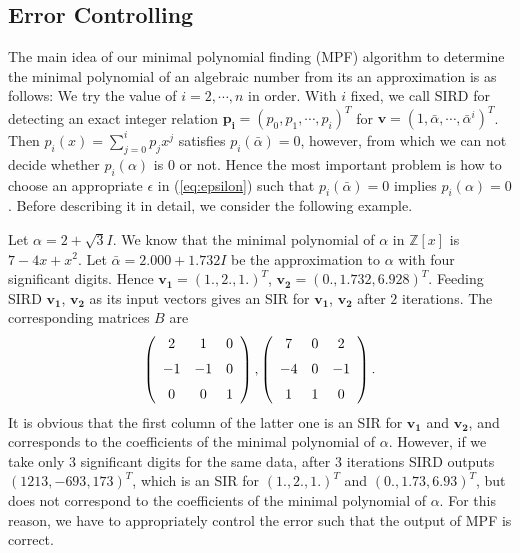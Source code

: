 \documentclass{sig-alternate}
\numberwithin{theorem}{section} \numberwithin{equation}{section}
\begin{document}
\subsection{Error Controlling}
\label{subsec:Finding the Minimal Polynomial Using Float-point
Arithmetic}






 The main idea of our minimal
polynomial finding (MPF) algorithm to determine the minimal
polynomial of an algebraic number from its an approximation is as
follows: We try the value of  $i=2,\cdots,n$ in order. With $i$
fixed, we call SIRD for detecting an exact integer relation
$\mathbf{p_i}=(p_0,p_1,\cdots,p_i)^T$ for $\mathbf{v}=(1,
\bar{\alpha}, \cdots, \bar{\alpha}^i)^T$. Then
$p_i(x)=\sum_{j=0}^ip_jx^j$ satisfies $p_i(\bar{\alpha})=0$,
however, from which we can not decide whether $p_i(\alpha)$ is $0$
or not. Hence the most important problem is how to choose an
appropriate $\epsilon$ in (\ref{eq:epsilon}) such that
$p_i(\bar{\alpha})=0$ implies $p_i(\alpha)=0$.
Before describing it
in detail, we consider the following example.

\begin{exmp}\label{exmp:x^2-4x+7}
Let $\alpha = 2 + \sqrt{3}I$. We know that the minimal polynomial of
$\alpha$ in $\mathbb{Z}[x]$ is $7-4x+x^2$. Let $\bar{\alpha} = 2.000
+ 1.732 I$ be the approximation to $\alpha$ with four significant
digits. Hence $\mathbf{v_1} = (1., 2., 1.)^T$, $\mathbf{v_2} = (0.,
1.732, 6.928)^T$. Feeding SIRD $\mathbf{v_1}$, $\mathbf{v_2}$ as its
input vectors gives an SIR for $\mathbf{v_1}$, $\mathbf{v_2}$ after
$2$ iterations. The corresponding matrices $B$ are
\[
 \left( \begin {array}{ccc} 2&1&0\\\noalign{\medskip}-1&-1&0
\\\noalign{\medskip}0&0&1\end {array} \right),
\left( \begin {array}{ccc}
7&0&2\\\noalign{\medskip}-4&0&-1\\\noalign{\medskip}1&1&0\end
{array} \right).
\]
It is obvious that the first column of the latter one
is an SIR for $\mathbf{v_1}$ and $\mathbf{v_2}$, and corresponds to
the coefficients of the minimal polynomial of $\alpha$. However, if
we take only $3$ significant digits for the same data, after $3$
iterations SIRD outputs $(1213,-693,173)^T$, which is an SIR for
$(1., 2., 1.)^T$ and $(0., 1.73, 6.93)^T$, but does not correspond
to the coefficients of the minimal polynomial of $\alpha$. For this
reason, we have to appropriately control the error such that the
output of MPF is correct.
\end{exmp}
\end{document}
